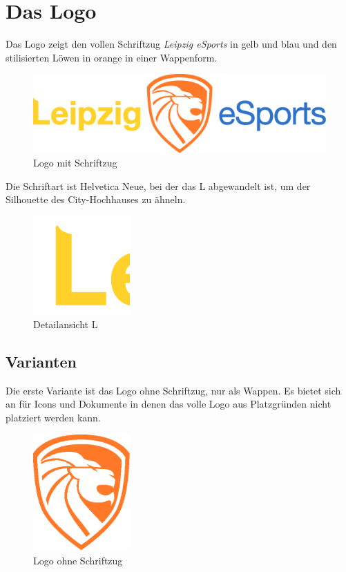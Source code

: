 \documentclass{article}
\begin{document}
\cleardoublepage
\section{Das Logo}

Das Logo zeigt den vollen Schriftzug \emph{Leipzig eSports} in gelb und blau und den stilisierten Löwen in orange in einer Wappenform.
\begin{figure}[H]
\includegraphics[width=\textwidth]{Docs/Logo.eps}
\caption{Logo mit Schriftzug}
\end{figure}

Die Schriftart ist Helvetica Neue, bei der das L abgewandelt ist, um der Silhouette des City-Hochhauses zu ähneln.

\begin{figure}[H]
\centering
\includegraphics[width=0.33\textwidth]{Docs/logo_detail_L.png}
\caption{Detailansicht L}
\end{figure}

\subsection{Varianten}

Die erste Variante ist das Logo ohne Schriftzug, nur als Wappen.
Es bietet sich an für Icons und Dokumente in denen das volle Logo aus Platzgründen nicht platziert werden kann.

\begin{figure}[H]
\centering
\includegraphics[width=0.33\textwidth]{Docs/Emblem.eps}
\caption{Logo ohne Schriftzug}
\end{figure}
\end{document}

